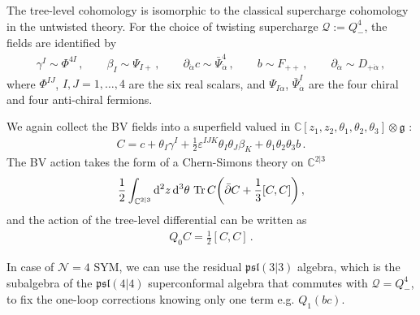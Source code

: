 \documentclass[11pt]{article}
\def\bbC{\mathbb{C}}
\renewcommand{\bm}{\mathcal}
\begin{document}
The tree-level cohomology is isomorphic to the classical supercharge cohomology in the untwisted theory. For the choice of twisting supercharge $\bm{Q}:= Q^4_-$, the fields are identified by
\begin{align}
    \gamma^I \sim \Phi^{4I} \, , \qquad \beta_I \sim \Psi_{I+} \, , \qquad \partial_{\dot\alpha} c \sim \bar\Psi^4_{\dot\alpha} \, , \qquad b\sim F_{++} \, , \qquad \partial_{\dot\alpha} \sim D_{+\dot\alpha} \, ,
\end{align}
where $\Phi^{IJ}$, $I,J=1,\dots,4$ are the six real scalars, and $\Psi_{I\dot\alpha}$, $\bar\Psi^I_{\dot\alpha}$ are the four chiral and four anti-chiral fermions.

We again collect the BV fields into a superfield valued in $\mathbb{C}[z_1,z_2,\theta_1,\theta_2,\theta_3]\otimes \mathfrak{g}$ \cite{Chang:2013fba}:
\begin{align}
    C = c + \theta_I \gamma^I +\frac{1}{2}\varepsilon^{IJK}\theta_I\theta_J\beta_K+\theta_1\theta_2\theta_3 b \, . \label{eq:C}
\end{align}
The BV action takes the form of a Chern-Simons theory on $\bbC^{2|3}$
\begin{align}
    \frac{1}{2}\int_{\mathbb{C}^{2|3}} \dd^2 z
\, \dd^3 \theta \, \Tr C\qty(\bar\partial C + \frac{1}{3}[C,C] ) \, ,
\end{align}
and the action of the tree-level differential can be written as
\begin{align}
    Q_0 C=\frac{1}{2}[C,C] \, .
\end{align}

In case of $\mathcal{N}=4$ SYM, we can use the residual $\mathfrak{psl}(3|3)$ algebra, which is the subalgebra of the $\mathfrak{psl}(4|4)$ superconformal algebra that commutes with $\bm{Q}=Q^4_{-}$, to fix the one-loop corrections knowing only one term e.g. $Q_1(bc)$. 
\end{document}
